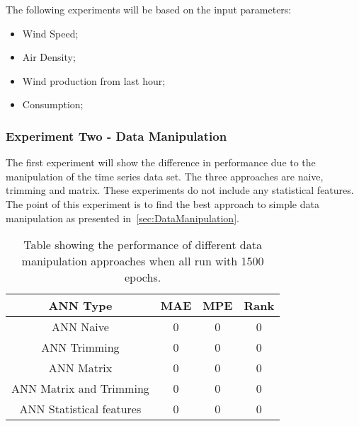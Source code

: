 
The following experiments will be based on the input parameters:
\begin{itemize}
\item Wind Speed;
\item Air Density;
\item Wind production from last hour;
\item Consumption;
\end{itemize}


\subsubsection{Experiment Two - Data Manipulation}
The first experiment will show the difference in performance due to the manipulation of the time series data set. The three approaches are naive, trimming and matrix. These experiments do not include any statistical features. The point of this experiment is to find the best approach to simple data manipulation as presented in~\ref{sec:DataManipulation}.


\begin{table}[H]
\centering  %
\begin{tabular}{c c c c} %
ANN Type & MAE & MPE & Rank \\ [0.5ex] %
\hline                  %
ANN Naive & 0 & 0 & 0 \\ %
ANN Trimming & 0 & 0 & 0 \\
ANN Matrix  & 0 & 0 & 0\\
ANN Matrix and Trimming  & 0 & 0 & 0 \\ 
ANN Statistical features  & 0 & 0 & 0\\ [1ex] %
\hline %
\end{tabular}
\caption{Table showing the performance of different data manipulation approaches when all run with 1500 epochs.} %
\label{table:dataManipulationApproaches} %
\end{table}


